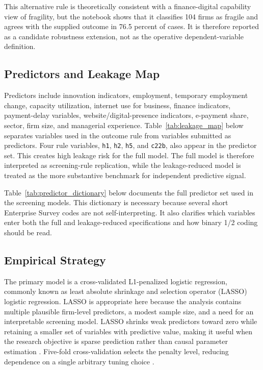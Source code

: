 This alternative rule is theoretically consistent with a finance-digital capability view of fragility, but the notebook shows that it classifies 104 firms as fragile and agrees with the supplied outcome in 76.5 percent of cases. It is therefore reported as a candidate robustness extension, not as the operative dependent-variable definition.

\subsection{Predictors and Leakage Map}

Predictors include innovation indicators, employment, temporary employment change, capacity utilization, internet use for business, finance indicators, payment-delay variables, website/digital-presence indicators, e-payment share, sector, firm size, and managerial experience. Table~\ref{tab:leakage_map} below separates variables used in the outcome rule from variables submitted as predictors. Four rule variables, \texttt{h1}, \texttt{h2}, \texttt{h5}, and \texttt{c22b}, also appear in the predictor set. This creates high leakage risk for the full model. The full model is therefore interpreted as screening-rule replication, while the leakage-reduced model is treated as the more substantive benchmark for independent predictive signal.

\begin{table}[H]
\centering
\caption{Outcome-Rule and Predictor Leakage Map}
\label{tab:leakage_map}
\small

\end{table}
\normalsize

Table~\ref{tab:predictor_dictionary} below documents the full predictor set used in the screening models. This dictionary is necessary because several short Enterprise Survey codes are not self-interpreting. It also clarifies which variables enter both the full and leakage-reduced specifications and how binary 1/2 coding should be read.

\small
\setlength{\tabcolsep}{3pt}
\setlength{\LTleft}{0pt}
\setlength{\LTright}{0pt}

\normalsize

\subsection{Empirical Strategy}

The primary model is a cross-validated L1-penalized logistic regression, commonly known as least absolute shrinkage and selection operator (LASSO) logistic regression. LASSO is appropriate here because the analysis contains multiple plausible firm-level predictors, a modest sample size, and a need for an interpretable screening model. LASSO shrinks weak predictors toward zero while retaining a smaller set of variables with predictive value, making it useful when the research objective is sparse prediction rather than causal parameter estimation \citep{tibshirani1996regression, friedman2010regularization, hastie2015sparsity}. Five-fold cross-validation selects the penalty level, reducing dependence on a single arbitrary tuning choice \citep{arlot2010crossvalidation, ahrens2020lassopack}.

